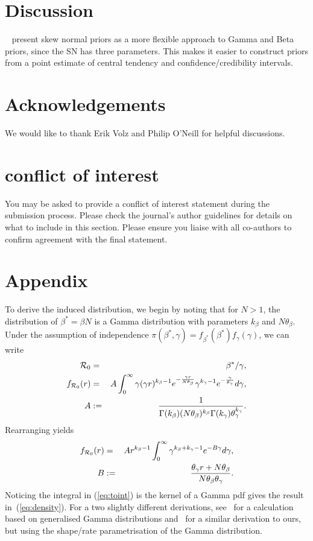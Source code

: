\documentclass[alpha-refs]{wiley-article}
\newcommand{\rr}{ {\cal R}_0 }						%
\begin{document}
\section*{Discussion}

~\citep{Weidemann2014} present skew normal priors as a more flexible approach to Gamma and Beta priors, since the SN has three parameters.
This makes it easier to construct priors from a point estimate of central tendency and confidence/credibility intervals.

\section*{Acknowledgements}
We would like to thank Erik Volz and Philip O'Neill for helpful discussions.

\section*{conflict of interest}
You may be asked to provide a conflict of interest statement during the submission process. Please check the journal's author guidelines for details on what to include in this section. Please ensure you liaise with all co-authors to confirm agreement with the final statement.


\section{Appendix}

To derive the induced distribution, we begin by noting that for $N > 1$, the distribution of $\beta^{\ast} = \beta N$ is a Gamma distribution with parameters $k_{\beta}$ and $N\theta_{\beta}$.
Under the assumption of independence $\pi(\beta^{\ast}, \gamma) = f_{\beta^\ast}(\beta^{\ast})f_{\gamma}(\gamma)$, we can write
\begin{eqnarray}
\rr &=& \beta^{\ast}/\gamma,\\
f_{\rr}(r) &=& A \int_{0}^{\infty} \gamma(\gamma r)^{k_{\beta} -1} e^{-\frac{\gamma r}{N\theta_{\beta}}} \gamma^{k_{\gamma} -1} e^{-\frac{\gamma}{\theta_{\gamma}}} d\gamma, \\
\nonumber
A &:=& \frac{1}{\Gamma(k_{\beta})(N\theta_{\beta})^{k_{\beta}}\Gamma(k_{\gamma})\theta_{\gamma}^{k_{\gamma}}}.
\end{eqnarray}
Rearranging yields
\begin{eqnarray}
\label{eq:toint}
f_{\rr}(r) &=& A  r^{k_{\beta} -1} \int_{0}^{\infty} \gamma^{k_{\beta} + k_{\gamma} -1} e^{-B\gamma} d\gamma, \\
\nonumber
        B  &:=& \frac{\theta_{\gamma} r + N\theta_{\beta}}{N\theta_{\beta}\theta_{\gamma}}.
\end{eqnarray}
Noticing the integral in (\ref{eq:toint}) is the kernel of a Gamma pdf gives the result in~(\ref{eq:density}).
For a two slightly different derivations, see~\cite{Coelho2007} for a calculation based on generalised Gamma distributions and~\cite{Clancy2008} for a similar derivation to ours, but using the shape/rate parametrisation of the Gamma distribution.
\end{document}
